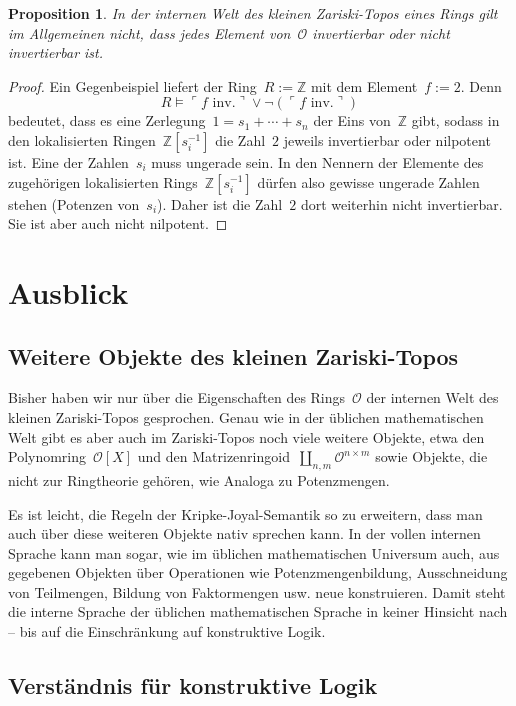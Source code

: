 \documentclass[a4paper,ngerman,12pt]{scrartcl}
\theoremstyle{definition}
\theoremstyle{plain}
\newtheorem{prop}[defn]{Proposition}
\theoremstyle{remark}
\newcommand{\ZZ}{\mathbb{Z}}
\renewcommand{\O}{\mathcal{O}}
\renewcommand{\_}{\mathpunct{.}\,}
\newcommand{\?}{\,{:}\,}
\newcommand{\speak}[1]{\ulcorner\text{#1}\urcorner}
\begin{document}
\begin{prop}In der internen Welt des kleinen Zariski-Topos eines Rings gilt im
Allgemeinen \emph{nicht}, dass jedes Element von~$\O$ invertierbar oder nicht
invertierbar ist.\end{prop}
\begin{proof}Ein Gegenbeispiel liefert der Ring~$R := \ZZ$ mit dem Element~$f
:= 2$. Denn
\[ R \models \speak{$f$ inv.} \vee \neg(\speak{$f$ inv.}) \]
bedeutet, dass es eine Zerlegung~$1 = s_1 + \cdots + s_n$ der Eins
von~$\ZZ$ gibt, sodass in den lokalisierten Ringen~$\ZZ[s_i^{-1}]$ die Zahl~$2$
jeweils invertierbar oder nilpotent ist. Eine der Zahlen~$s_i$ muss ungerade
sein. In den Nennern der Elemente des zugehörigen lokalisierten
Rings~$\ZZ[s_i^{-1}]$ dürfen also gewisse ungerade Zahlen stehen (Potenzen
von~$s_i$). Daher ist die Zahl~$2$ dort weiterhin nicht invertierbar. Sie ist
aber auch nicht nilpotent.
\end{proof}


\section{Ausblick}

\subsection*{Weitere Objekte des kleinen Zariski-Topos}

Bisher haben wir nur über die Eigenschaften des Rings~$\O$ der internen Welt
des kleinen Zariski-Topos gesprochen. Genau wie in der üblichen mathematischen
Welt gibt es aber auch im Zariski-Topos noch viele weitere Objekte, etwa
den Polynomring~$\O[X]$ und den Matrizenringoid~$\amalg_{n,m} \O^{n \times
m}$ sowie Objekte, die nicht zur Ringtheorie gehören, wie
Analoga zu Potenzmengen.

Es ist leicht, die Regeln der Kripke-Joyal-Semantik so zu erweitern, dass man
auch über diese weiteren Objekte nativ sprechen kann. In der vollen internen
Sprache kann man sogar, wie im üblichen mathematischen Universum auch, aus
gegebenen Objekten über Operationen wie Potenzmengenbildung, Ausschneidung von
Teilmengen, Bildung von Faktormengen usw. neue konstruieren. Damit
steht die interne Sprache der üblichen mathematischen Sprache in keiner
Hinsicht nach -- bis auf die Einschränkung auf konstruktive Logik.


\subsection*{Verständnis für konstruktive Logik}
\end{document}
